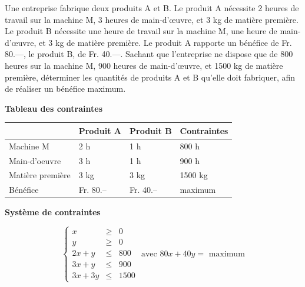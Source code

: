 \begin{exemple}
Une entreprise fabrique deux produits A et B. Le produit A nécessite 2 heures de travail sur la machine M, 3 heures de main-d’œuvre, et 3 kg de matière première. Le produit B nécessite une heure de travail sur la machine M, une heure de main-d’œuvre, et 3 kg de matière première. Le produit A rapporte un bénéfice de Fr. 80.—, le produit B, de Fr. 40.—. Sachant que l’entreprise ne dispose que de 800 heures sur la machine M, 900 heures de main-d’œuvre, et 1500 kg de matière première, déterminer les quantités de produits A et B qu’elle doit fabriquer, afin de réaliser un bénéfice maximum.

\textbf{Tableau des contraintes}

\begin{tabular}{l|l|l|l|}
\cline{2-4}
                                       & Produit A & Produit B & Contraintes \\ \hline
\multicolumn{1}{|l|}{Machine M}        & 2 h       & 1 h       & 800 h       \\ \hline
\multicolumn{1}{|l|}{Main-d'oeuvre}    & 3 h       & 1 h       & 900 h       \\ \hline
\multicolumn{1}{|l|}{Matière première} & 3 kg      & 3 kg      & 1500 kg     \\ \hline
\multicolumn{1}{|l|}{Bénéfice}         & Fr. 80.-- & Fr. 40.-- & maximum     \\ \hline
\end{tabular}

\textbf{Système de contraintes}

$$
\left\{
\begin{array}{lcl}
x&\geq& 0\\
y&\geq & 0\\
2x+y &\leq & 800\\
3x+y &\leq & 900\\
3x+3y &\leq & 1500
\end{array}
\right.
\mbox{ avec } 80x+40y = \mbox{ maximum}
$$


\end{exemple}
